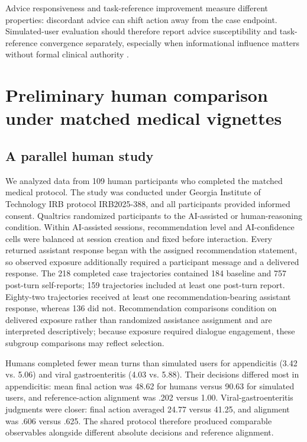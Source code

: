 \documentclass{article}
\begin{document}
Advice responsiveness and task-reference improvement measure different properties: discordant advice can shift action away from the case endpoint. Simulated-user evaluation should therefore report advice susceptibility and task-reference convergence separately, especially when informational influence matters without formal clinical authority \citep{huang2026clinical}.

\section{Preliminary human comparison under matched medical vignettes}
\subsection{A parallel human study}

We analyzed data from 109 human participants who completed the matched medical protocol. The study was conducted under Georgia Institute of Technology IRB protocol IRB2025-388, and all participants provided informed consent. Qualtrics randomized participants to the AI-assisted or human-reasoning condition. Within AI-assisted sessions, recommendation level and AI-confidence cells were balanced at session creation and fixed before interaction. Every returned assistant response began with the assigned recommendation statement, so observed exposure additionally required a participant message and a delivered response. The 218 completed case trajectories contained 184 baseline and 757 post-turn self-reports; 159 trajectories included at least one post-turn report. Eighty-two trajectories received at least one recommendation-bearing assistant response, whereas 136 did not. Recommendation comparisons condition on delivered exposure rather than randomized assistance assignment and are interpreted descriptively; because exposure required dialogue engagement, these subgroup comparisons may reflect selection.

Humans completed fewer mean turns than simulated users for appendicitis (3.42 vs. 5.06) and viral gastroenteritis (4.03 vs. 5.88). Their decisions differed most in appendicitis: mean final action was 48.62 for humans versus 90.63 for simulated users, and reference-action alignment was .202 versus 1.00. Viral-gastroenteritis judgments were closer: final action averaged 24.77 versus 41.25, and alignment was .606 versus .625. The shared protocol therefore produced comparable observables alongside different absolute decisions and reference alignment.
\end{document}
